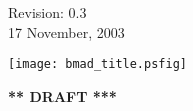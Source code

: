 \thispagestyle{empty}

\begin{flushright}
\large
  Revision: 0.3 \\
  17 November, 2003 \\
\end{flushright}

\vfill

{
\begin{center}
\texttt{[image: bmad\_title.psfig]} \\
\end{center}
}

\vskip 1in
\begin{center}
{\Huge \bf *** DRAFT ***}
\end{center}
\vfill
\break
